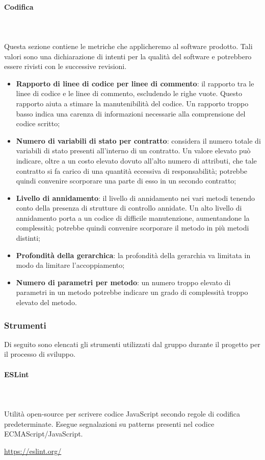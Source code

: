 \paragraph{Codifica} \mbox{}\\ \mbox{}\\
Questa sezione contiene le metriche che applicheremo al software prodotto. Tali  valori  sono  una  dichiarazione  di  intenti  per  la qualità del software e potrebbero essere rivisti con le successive revisioni.
	\begin{itemize}
		\item \textbf{Rapporto di linee di codice per linee di commento}: il rapporto tra le linee di codice e le linee di commento, escludendo le righe vuote.  Questo rapporto aiuta a stimare la manutenibilità del codice.  Un rapporto troppo basso indica una carenza di informazioni	necessarie alla comprensione del codice scritto;
		\item \textbf{Numero di variabili di stato per contratto}: considera il numero totale di variabili di stato presenti all'interno di un contratto. Un valore elevato può indicare, oltre a un costo elevato dovuto all'alto numero di attributi, che tale contratto si fa carico di una quantità eccessiva di responsabilità; potrebbe quindi convenire scorporare una parte di esso in un secondo contratto;
		\item \textbf{Livello di annidamento}: il livello di annidamento nei vari metodi tenendo	conto della presenza di strutture di controllo annidate.  Un alto livello di annidamento porta a un codice di difficile manutenzione, aumentandone la complessità; potrebbe quindi convenire scorporare il metodo in più metodi distinti;
		\item \textbf{Profondità della gerarchica}: la profondità della gerarchia va limitata in modo da limitare l'accoppiamento;
		\item \textbf{Numero di parametri per metodo}: un numero troppo elevato di parametri in un metodo potrebbe indicare un grado di complessità troppo elevato del metodo.
	\end{itemize}

\subsubsection{Strumenti}
Di seguito sono elencati gli strumenti utilizzati dal gruppo durante il 
progetto per il processo di sviluppo.
		
\paragraph{ESLint} \mbox{}\\ \mbox{}\\
Utilità open-source per scrivere codice JavaScript secondo regole di codifica 
predeterminate. Esegue segnalazioni su patterns presenti nel codice 
ECMAScript/JavaScript.\\
\centerline{\url{https://eslint.org/}}
		
